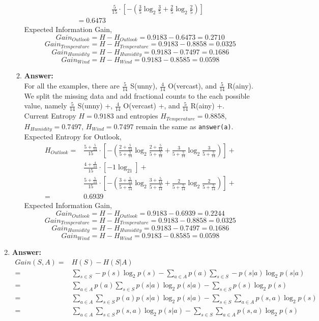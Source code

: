 \documentclass[12pt, fullpage,letterpaper]{article}
\begin{document}
\begin{enumerate}
\begin{enumerate}
\begin{align*}
&\frac{5}{15} \cdot [-(\frac{3}{5}\log_2\frac{3}{5}+\frac{2}{5}\log_2\frac{2}{5})]\\
=0.6473&
\end{align*}
Expected Information Gain,
$$Gain_{Outlook}=H-H_{Outlook}=0.9183-0.6473=0.2710$$
$$Gain_{Temperature}=H-H_{Temperature}=0.9183-0.8858=0.0325$$
$$Gain_{Humidity}=H-H_{Humidity}=0.9183-0.7497=0.1686$$
$$Gain_{Wind}=H-H_{Wind}=0.9183-0.8585=0.0598$$
\item \textbf{Answer:}\\
For all the examples, there are $\frac{5}{14}$ S(unny), $\frac{4}{14}$ O(vercast), and $\frac{5}{14}$ R(ainy). We split the missing data and add fractional counts to the each possible value, namely $\frac{5}{14}$ S(unny) +, $\frac{4}{14}$ O(vercast) +, and $\frac{5}{14}$ R(ainy) +.\\
Current Entropy $H=0.9183$ and entropies $H_{Temperature}=0.8858$, $H_{Humidity}=0.7497$, $H_{Wind}=0.7497$ remain the same as \texttt{answer(a)}.\\
Expected Entropy for Outlook,
\begin{align*}
H_{Outlook}=&\frac{5+\frac{5}{14}}{15} \cdot [-(\frac{2+\frac{5}{14}}{5+\frac{5}{14}}\log_2\frac{2+\frac{5}{14}}{5+\frac{5}{14}}+\frac{3}{5+\frac{5}{14}}\log_2\frac{3}{5+\frac{5}{14}})]+\\
&\frac{4+\frac{4}{14}}{15} \cdot [-1\log_21]+\\
&\frac{5+\frac{5}{14}}{15} \cdot [-(\frac{3+\frac{5}{14}}{5+\frac{5}{14}}\log_2\frac{3+\frac{5}{14}}{5+\frac{5}{14}}+\frac{2}{5+\frac{5}{14}}\log_2\frac{2}{5+\frac{5}{14}})]+\\
=&0.6939
\end{align*}
Expected Information Gain,
$$Gain_{Outlook}=H-H_{Outlook}=0.9183-0.6939=0.2244$$
$$Gain_{Temperature}=H-H_{Temperature}=0.9183-0.8858=0.0325$$
$$Gain_{Humidity}=H-H_{Humidity}=0.9183-0.7497=0.1686$$
$$Gain_{Wind}=H-H_{Wind}=0.9183-0.8585=0.0598$$
\end{enumerate}
\item \textbf{Answer:}
\begin{align}
Gain(S,A)=&H(S)-H(S|A)\\
=&\sum_{s\in S}-p(s)\log_2p(s)-\sum_{a\in A}p(a)\sum_{s\in S}-p(s|a)\log_2p(s|a)\\
=&\sum_{a\in A}p(a)\sum_{s\in S}p(s|a)\log_2p(s|a)-\sum_{s\in S}p(s)\log_2p(s)\\
=&\sum_{a\in A}\sum_{s\in S}p(a)p(s|a)\log_2p(s|a)-\sum_{s\in S}\sum_{a\in A}p(s,a)\log_2p(s)\\
=&\sum_{a\in A}\sum_{s\in S}p(s,a)\log_2p(s|a)-\sum_{s\in S}\sum_{a\in A}p(s,a)\log_2p(s)\\

\end{align}
\end{enumerate}
\end{document}
